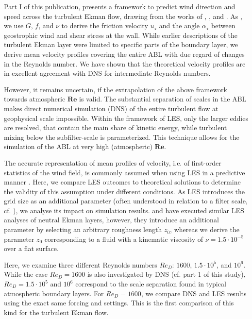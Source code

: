 \documentclass[smallcondensed,draft]{svjour3}
\newcommand{\RE}{\mathbf{Re}}
\begin{document}
Part I of this publication, presents a framework to predict wind direction and speed across the turbulent Ekman flow, drawing from the works of \cite{csanady1967resistance}, \cite{tennekes1973logarithmic}, and \cite{spalart1989theoretical}. As \cite{spalart1989theoretical}, we use $G$, $f$, and $\nu$ to derive the friction velocity $u_\star$ and the angle $\alpha_\star$ between geostrophic wind and shear stress at the wall. While earlier descriptions of the turbulent Ekman layer were limited to specific parts of the boundary layer, we derive mean velocity profiles covering the entire ABL with due regard of changes in the Reynolds number. We have shown that the theoretical velocity profiles are in excellent agreement with DNS for intermediate Reynolds numbers. 

However, it remains uncertain, if the extrapolation of the above framework towards atmospheric $\RE$ is valid. The substantial separation of scales in the ABL makes direct numerical simulation (DNS) of the entire turbulent flow at geophysical scale impossible. Within the framework of LES, only the larger eddies are resolved, that contain the main share of kinetic energy, while turbulent mixing below the subfilter-scale is parameterized. This technique allows for the simulation of the ABL at very high (atmospheric) $\RE$. 

The accurate representation of mean profiles of velocity, i.e. of first-order statistics of the wind field, is commonly assumed when using LES in a predictive manner  \citep{fedorovich2004convective}. Here, we compare LES outcomes to theoretical solutions to determine the validity of this assumption under different conditions. As LES introduces the grid size as an additional parameter (often understood in relation to a filter scale, cf. \cite{pope2004ten}), we analyse its impact on simulation results. \cite{esau2004simulation} and \cite{jiang2018large} have executed similar LES analyses of neutral Ekman layers, however, they introduce an additional parameter by selecting an arbitrary roughness length $z_0$, whereas we derive the parameter $z_0$ corresponding to a fluid with a kinematic viscosity of $\nu = 1.5\cdot10^{-5}$ over a flat surface.

Here, we examine three different Reynolds numbers $Re_D$: $1600$, $1.5\cdot10^5$, and $10^6$. While the case $Re_D=1600$ is also investigated by DNS (cf. part 1 of this study), $Re_D=1.5 \cdot 10^5$ and $10^6$ correspond to the scale separation found in typical atmospheric boundary layers. For $Re_D=1600$, we compare DNS \citep{ansorge:2024b} and LES results using the exact same forcing and settings. This is the first comparison of this kind for the turbulent Ekman flow. 
\end{document}
